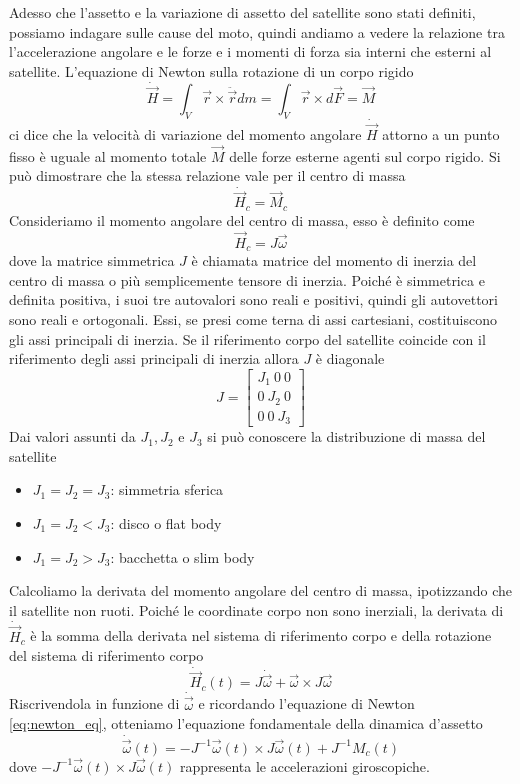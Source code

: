 Adesso che l'assetto e la variazione di assetto del satellite sono stati
definiti, possiamo indagare sulle cause del moto, quindi andiamo a vedere la
relazione tra l'accelerazione angolare e le forze e i momenti di
forza sia interni che esterni al satellite.
L'equazione di Newton sulla rotazione di un corpo rigido
\begin{equation}
\dot{\vec{H}}=\int_V\vec{r}\times\ddot{\vec{r}}dm=\int_V\vec{r}\times
d\vec{F}=
\vec{M}
\label{eq:newton_eq}
\end{equation} 
ci dice che la velocità di variazione del momento angolare $\dot{\vec{H}}$
attorno a un punto fisso è uguale al momento totale $\vec{M}$ delle forze esterne agenti
sul corpo rigido. Si può dimostrare che la stessa relazione vale per il centro
di massa
\begin{equation}
\dot{\vec{H}}_c=\vec{M}_c
\end{equation}
Consideriamo il momento angolare del centro di massa, esso è definito come
\begin{equation}
\vec{H}_c=J\vec{\omega}
\end{equation}
dove la matrice simmetrica $J$ è chiamata matrice del momento di inerzia del
centro di massa o più semplicemente tensore di inerzia.
Poiché è simmetrica e definita positiva, i suoi tre autovalori sono reali e
positivi, quindi gli autovettori sono reali e ortogonali. Essi, se presi come
terna di assi cartesiani, costituiscono gli assi principali di inerzia. Se il
riferimento corpo del satellite coincide con il riferimento degli assi
principali di inerzia allora $J$ è diagonale
\begin{equation}
J=\begin{bmatrix}
J_1 \ 0 \ 0\\0 \ J_2 \ 0\\0 \ 0 \ J_3
\end{bmatrix}
\end{equation}
Dai valori assunti da $J_1, J_2$ e $J_3$ si può conoscere la distribuzione di
massa del satellite
\begin{itemize}
  \item $J_1=J_2=J_3$: simmetria sferica
  \item $J_1=J_2<J_3$: disco o flat body
  \item $J_1=J_2>J_3$: bacchetta o slim body
\end{itemize}
Calcoliamo la derivata del momento angolare del centro di massa, ipotizzando che
il satellite non ruoti. Poiché le coordinate corpo non sono inerziali, la
derivata di $\dot{\vec{H}}_c$ è la somma della derivata nel sistema di
riferimento corpo e della rotazione del sistema di riferimento corpo
\begin{equation}
\dot{\vec{H}}_c(t)=J\dot{\vec{\omega}}+\vec{\omega}\times J\vec{\omega}
\end{equation}
Riscrivendola in funzione di $\dot{\vec{\omega}}$ e ricordando
l'equazione di Newton \ref{eq:newton_eq}, otteniamo l'equazione fondamentale
della dinamica d'assetto
\begin{equation}
\dot{\vec{\omega}}(t)=-J^{-1}\vec{\omega}(t)\times J\vec{\omega}(t)+J^{-1}M_c(t)
\end{equation}
dove $-J^{-1}\vec{\omega}(t)\times J\vec{\omega}(t)$ rappresenta le
accelerazioni giroscopiche.

